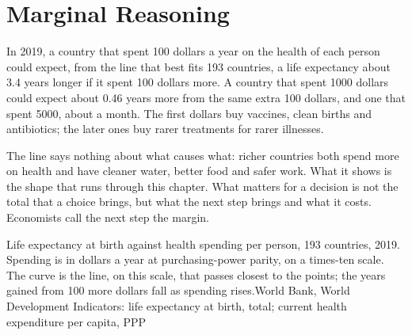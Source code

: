 \chapter{Marginal Reasoning}\label{ch:g11:marginal-reasoning}

In 2019, a country that spent 100 dollars a year on the health of each person could expect, from the line that best fits 193 countries, a life expectancy
about 3.4 years longer if it spent 100 dollars more. A country that spent 1000 dollars could expect about 0.46 years more from the same extra 100 dollars,
and one that spent 5000, about a month. The first dollars buy vaccines, clean births and antibiotics; the later ones buy rarer treatments for rarer illnesses.

The line says nothing about what causes what: richer countries both spend more on health and have cleaner water, better food and safer work. What it shows
is the shape that runs through this chapter. What matters for a decision is not the total that a choice brings, but what the next step brings and what it
costs. Economists call the next step the margin.

\begin{openingchart}{Life expectancy at birth against health spending per person, 193 countries, 2019. Spending is in dollars a year at purchasing-power
parity, on a times-ten scale. The curve is the line, on this scale, that passes closest to the points; the years gained from 100 more dollars fall as spending
rises.}{World Bank, World Development Indicators: life expectancy at birth, total; current health expenditure per capita, PPP}
\end{openingchart}

